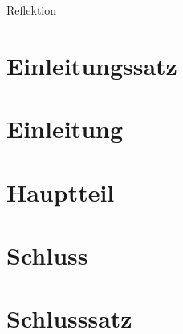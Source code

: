 \documentclass[biblatex]{lni}
\begin{document}
  \begin{center}
    \LARGE Reflektion
  \end{center}

  \section{Einleitungssatz}

  \section{Einleitung}

  \section{Hauptteil}

  \section{Schluss}

  \section{Schlusssatz}
\end{document}
